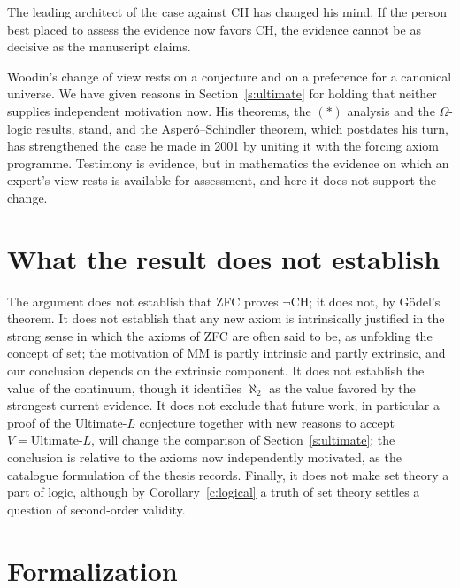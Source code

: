 \documentclass{situationist-preprint}
\begin{document}
\begin{objection}
The leading architect of the case against CH has changed his mind. If the person best placed to assess the evidence now favors CH, the evidence cannot be as decisive as the manuscript claims.
\end{objection}

\begin{reply}
Woodin's change of view rests on a conjecture and on a preference for a canonical universe. We have given reasons in Section~\ref{s:ultimate} for holding that neither supplies independent motivation now. His theorems, the $(*)$ analysis and the $\Omega$-logic results, stand, and the Asperó--Schindler theorem, which postdates his turn, has strengthened the case he made in 2001 by uniting it with the forcing axiom programme. Testimony is evidence, but in mathematics the evidence on which an expert's view rests is available for assessment, and here it does not support the change.
\end{reply}

\section{What the result does not establish}\label{s:limits}

The argument does not establish that ZFC proves $\neg$CH; it does not, by Gödel's theorem. It does not establish that any new axiom is intrinsically justified in the strong sense in which the axioms of ZFC are often said to be, as unfolding the concept of set; the motivation of MM is partly intrinsic and partly extrinsic, and our conclusion depends on the extrinsic component. It does not establish the value of the continuum, though it identifies $\aleph_2$ as the value favored by the strongest current evidence. It does not exclude that future work, in particular a proof of the Ultimate-$L$ conjecture together with new reasons to accept $V = \text{Ultimate-}L$, will change the comparison of Section~\ref{s:ultimate}; the conclusion is relative to the axioms now independently motivated, as the catalogue formulation of the thesis records. Finally, it does not make set theory a part of logic, although by Corollary~\ref{c:logical} a truth of set theory settles a question of second-order validity.

\section{Formalization}\label{s:formal}
\end{document}
